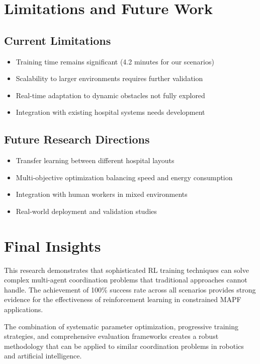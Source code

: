 \documentclass[12pt, a4paper]{report}
\begin{document}
\section{Limitations and Future Work}

\subsection{Current Limitations}
\begin{itemize}
    \item Training time remains significant (4.2 minutes for our scenarios)
    \item Scalability to larger environments requires further validation
    \item Real-time adaptation to dynamic obstacles not fully explored
    \item Integration with existing hospital systems needs development
\end{itemize}

\subsection{Future Research Directions}
\begin{itemize}
    \item Transfer learning between different hospital layouts
    \item Multi-objective optimization balancing speed and energy consumption
    \item Integration with human workers in mixed environments
    \item Real-world deployment and validation studies
\end{itemize}

\section{Final Insights}

This research demonstrates that sophisticated RL training techniques can solve complex multi-agent coordination problems that traditional approaches cannot handle. The achievement of 100\% success rate across all scenarios provides strong evidence for the effectiveness of reinforcement learning in constrained MAPF applications.

The combination of systematic parameter optimization, progressive training strategies, and comprehensive evaluation frameworks creates a robust methodology that can be applied to similar coordination problems in robotics and artificial intelligence.
\end{document}
